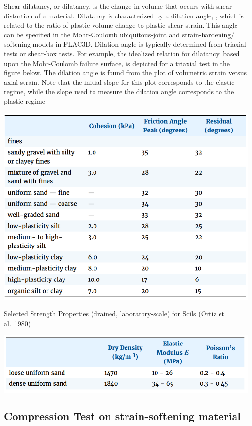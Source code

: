 \documentclass[a4paper, nobind]{templates/ociamthesis}
\begin{document}
Shear dilatancy, or dilatancy, is the change in volume that occurs with
shear distortion of a material. Dilatancy is characterized by a dilation
angle, , which is related to the ratio of plastic volume change to
plastic shear strain. This angle can be specified in the Mohr-Coulomb
ubiquitous-joint and strain-hardening/ softening models in FLAC3D.
Dilation angle is typically determined from triaxial tests or shear-box
tests. For example, the idealized relation for dilatancy, based upon the
Mohr-Coulomb failure surface, is depicted for a triaxial test in the
figure below. The dilation angle is found from the plot of volumetric
strain versus axial strain. Note that the initial slope for this plot
corresponds to the elastic regime, while the slope used to measure the
dilation angle corresponds to the plastic regime

\includegraphics[width=1\linewidth]{myfigureeeeee/typical_angles}

Selected Strength Properties (drained, laboratory-scale) for Soils
(Ortiz et al.~1980)

\includegraphics[width=1\linewidth]{myfigureeeeee/typical_sand}

\hypertarget{compression-test-on-strain-softening-material}{%
\subsection{Compression Test on strain-softening material}\label{compression-test-on-strain-softening-material}}
\end{document}
